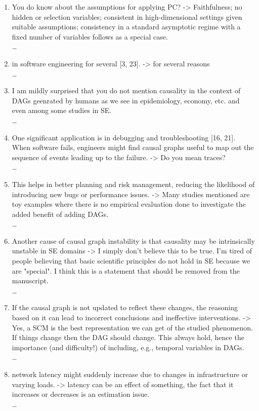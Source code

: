 \documentclass[]{svjour3}
\begin{document}
\begin{enumerate}
\begin{enumerate}
        \item You do know about the assumptions for applying PC? -> Faithfulness; no hidden or selection variables; consistent in
high-dimensional settings given suitable assumptions; consistency in a standard asymptotic regime with a fixed number of variables follows as
a special case.\\{\MARK \dots}
    \item in software engineering for several [3, 23]. -> for several reasons\\{\MARK \dots}
    \item  I am mildly surprised that you do not mention causality in the context of DAGs geenrated by humans as we see in epidemiology, economy, etc. and even among some studies in SE.\\{\MARK \dots}
    \item One significant application is in debugging and troubleshooting [16, 21]. When software fails, engineers might find causal graphs useful to map out the sequence of events leading up to the failure. -> Do you mean traces?\\{\MARK \dots}
    \item This helps in better planning and risk management, reducing the likelihood of introducing new bugs or performance issues. -> Many studies mentioned are toy examples where there is no empirical evaluation done to investigate the added benefit of adding DAGs.\\{\MARK \dots}
    \item  Another cause of causal graph instability is that causality may be intrinsically unstable in SE domains -> I simply don't believe this to be true. I'm tired of people believing that basic scientific principles do not hold in SE because we are "special". I think this is a statement that should be removed from the manuscript.\\{\MARK \dots}
    \item If the causal graph is not updated to reflect these changes, the reasoning based on it can lead to incorrect conclusions and ineffective interventions. -> Yes, a SCM is the best representation we can get of the studied phenomenon. If things change then the DAG should change. This always hold, hence the importance (and difficulty!) of including, e.g., temporal variables in DAGs.\\{\MARK \dots}
    \item network latency might suddenly increase due to changes in infrastructure or varying loads. -> latency can be an effect of something, the fact that it increases or decreases is an estimation issue.\\{\MARK \dots}

\end{enumerate}
\end{enumerate}
\end{document}
